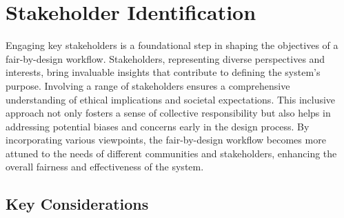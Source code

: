 \documentclass[12pt,a4paper,openright,twoside]{book}
\begin{document}
\section{Stakeholder Identification}
\label{section:stakeholder-identification}

Engaging key stakeholders is a foundational step in shaping the objectives of a fair-by-design workflow. Stakeholders, representing diverse perspectives and interests, bring invaluable insights that contribute to defining the system's purpose. Involving a range of stakeholders ensures a comprehensive understanding of ethical implications and societal expectations. This inclusive approach not only fosters a sense of collective responsibility but also helps in addressing potential biases and concerns early in the design process. By incorporating various viewpoints, the fair-by-design workflow becomes more attuned to the needs of different communities and stakeholders, enhancing the overall fairness and effectiveness of the system.

\subsection{Key Considerations}
\end{document}
